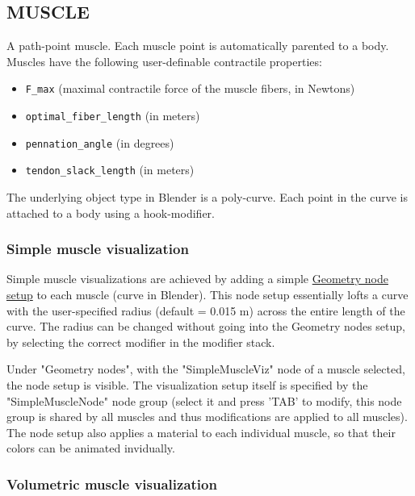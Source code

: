 \documentclass{article}
\begin{document}
\subsection{MUSCLE}
\label{sec:muscle}
A path-point muscle. Each muscle point is automatically parented to a body. Muscles have the following user-definable contractile properties:

\begin{itemize}
    \item \texttt{F\_max} (maximal contractile force of the muscle fibers, in Newtons)
    \item \texttt{optimal\_fiber\_length} (in meters)
    \item \texttt{pennation\_angle} (in degrees)
    \item \texttt{tendon\_slack\_length} (in meters)
\end{itemize}

The underlying object type in Blender is a poly-curve. Each point in the curve is attached to a body using a hook-modifier.

\subsubsection{Simple muscle visualization}
\label{sec:simplemuscleviz}

Simple muscle visualizations are achieved by adding a simple \href{https://docs.blender.org/manual/en/latest/modeling/geometry_nodes/index.html}{Geometry node setup} to each muscle (curve in Blender). This node setup essentially lofts a curve with the user-specified radius (default = 0.015 m) across the entire length of the curve. The radius can be changed without going into the Geometry nodes setup, by selecting the correct modifier in the modifier stack.

Under "Geometry nodes", with the "SimpleMuscleViz" node of a muscle selected, the node setup is visible. The visualization setup itself is specified by the "SimpleMuscleNode" node group (select it and press 'TAB' to modify, this node group is shared by all muscles and thus modifications are applied to all muscles). The node setup also applies a material to each individual muscle, so that their colors can be animated invidually.



\subsubsection{Volumetric muscle visualization}
\label{sec:volmuscleviz}
\end{document}
